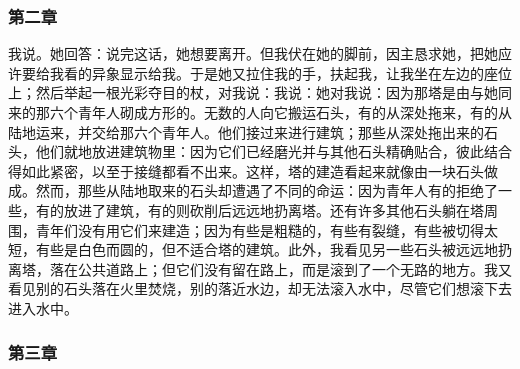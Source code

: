 
\subsubsection{第二章}

我说。她回答：说完这话，她想要离开。但我伏在她的脚前，因主恳求她，把她应许要给我看的异象显示给我。于是她又拉住我的手，扶起我，让我坐在左边的座位上；然后举起一根光彩夺目的杖，对我说：我说：她对我说：因为那塔是由与她同来的那六个青年人砌成方形的。无数的人向它搬运石头，有的从深处拖来，有的从陆地运来，并交给那六个青年人。他们接过来进行建筑；那些从深处拖出来的石头，他们就地放进建筑物里：因为它们已经磨光并与其他石头精确贴合，彼此结合得如此紧密，以至于接缝都看不出来。这样，塔的建造看起来就像由一块石头做成。然而，那些从陆地取来的石头却遭遇了不同的命运：因为青年人有的拒绝了一些，有的放进了建筑，有的则砍削后远远地扔离塔。还有许多其他石头躺在塔周围，青年们没有用它们来建造；因为有些是粗糙的，有些有裂缝，有些被切得太短，有些是白色而圆的，但不适合塔的建筑。此外，我看见另一些石头被远远地扔离塔，落在公共道路上；但它们没有留在路上，而是滚到了一个无路的地方。我又看见别的石头落在火里焚烧，别的落近水边，却无法滚入水中，尽管它们想滚下去进入水中。\par


\subsubsection{第三章}

